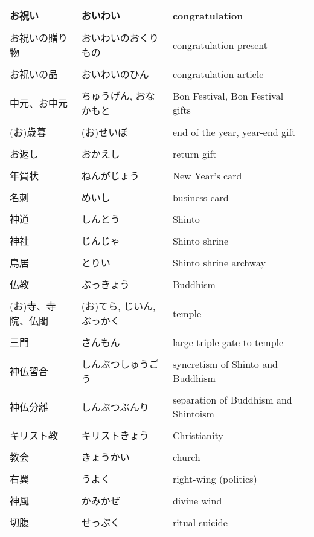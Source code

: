 \documentclass{article}
\begin{document}
\begin{tabular}{ l | p{6.7cm} | p{7.5cm} }
お祝い			& おいわい 				& congratulation						\\ \hline \\[-1em]
お祝いの贈り物 		& おいわいのおくりもの 			& congratulation-present				\\ \hline \\[-1em]
お祝いの品 		& おいわいのひん		& congratulation-article				\\ \hline \\[-1em]
中元、お中元 		& ちゅうげん, おなかもと 		& Bon Festival, Bon Festival gifts		\\ \hline \\[-1em]
(お)歳暮 			& (お)せいぼ 				& end of the year, year-end gift		\\ \hline \\[-1em]
お返し 			& おかえし 				& return gift							\\ \hline \\[-1em]
年賀状 			& ねんがじょう 				& New Year's card						\\ \hline \\[-1em]
名刺				& めいし 					& business card 						\\ \hline \\[-1em]
神道 			& しんとう 					& Shinto								\\ \hline \\[-1em]
神社 			& じんじゃ 					& Shinto shrine							\\ \hline \\[-1em]
鳥居 			& とりい 					& Shinto shrine archway					\\ \hline \\[-1em]
仏教 			& ぶっきょう 				& Buddhism								\\ \hline \\[-1em]
(お)寺、寺院、仏閣	& (お)てら, じいん, ぶっかく 	& temple								\\ \hline \\[-1em]
三門				& さんもん 				& large triple gate to temple			\\ \hline \\[-1em]
神仏習合			& しんぶつしゅうごう			& syncretism of Shinto and Buddhism		\\ \hline \\[-1em]
神仏分離			& しんぶつぶんり 				& separation of Buddhism and Shintoism	\\ \hline \\[-1em]
キリスト教 			& キリストきょう 				& Christianity							\\ \hline \\[-1em]
教会 			& きょうかい 				& church								\\ \hline \\[-1em]
右翼				& うよく 					& right-wing (politics)					\\ \hline \\[-1em]
神風				& かみかぜ 				& divine wind							\\ \hline \\[-1em]
切腹 			& せっぷく 					& ritual suicide 					   %
\end{tabular}
\end{document}
